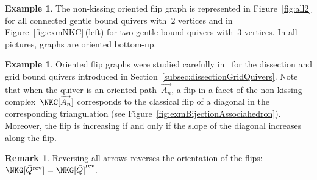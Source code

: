 \documentclass{amsart}
\theoremstyle{definition}
\newtheorem{example}[theorem]{Example}
\newtheorem{remark}[theorem]{Remark}
\newcommand{\ssm}{\smallsetminus} %
\newcommand{\eqdef}{\mbox{\,\raisebox{0.2ex}{\scriptsize\ensuremath{\mathrm:}}\ensuremath{=}\,}} %
\newcommand{\fref}[1]{Figure~\ref{#1}} %
\DeclareRobustCommand{\exmAn}{\overrightarrow{A_n}} %
\newcommand{\vincent}[1]{\todo[color=blue!30]{#1 \\ \hfill --- V.}}
\newcommand{\blossom}{^\text{\ding{96}}} %
\newcommand{\reversed}[1]{#1^{\mathrm{rev}}} %
\begin{document}
\begin{example}
The non-kissing oriented flip graph is represented in \fref{fig:all2} for all connected gentle bound quivers with~$2$ vertices and in \fref{fig:exmNKC}\,(left) for two gentle bound quivers with~$3$ vertices.
In all pictures, graphs are oriented bottom-up.
\end{example}

\begin{example}
Oriented flip graphs were studied carefully in~\cite{GarverMcConville, MannevillePilaud-accordion, McConville} for the dissection and grid bound quivers introduced in Section~\ref{subsec:dissectionGridQuivers}.
Note that when the quiver is an oriented path~$\exmAn$, a flip in a facet of the non-kissing complex~$\NKC[\exmAn]$ corresponds to the classical flip of a diagonal in the corresponding triangulation (see \fref{fig:exmBijectionAssociahedron}).
Moreover, the flip is increasing if and only if the slope of the diagonal increases along the flip.
\end{example}

\begin{remark}
\label{rem:reverseFlipGraph}
Reversing all arrows reverses the orientation of the flips: $\NKG[\reversed{\bar Q}] = \reversed{\NKG[\bar Q]}$.
\end{remark}

%
%

\end{document}
